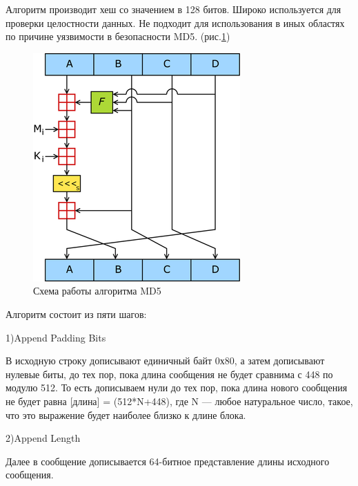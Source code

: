 \documentclass[a4paper, 12pt, oneside]{scrartcl}
\begin{document}
    Алгоритм производит хеш со значением в 128 битов. Широко используется для проверки целостности данных.
    Не подходит для использования в иных областях по причине уязвимости в безопасности MD5. (рис.\ref{fig:key})
    \begin{figure}[h!]
		\centering
		\includegraphics[scale=0.9]{MD5}
		\caption{Схема работы алгоритма MD5}
		\label{fig:key}
	\end{figure}
    \par
    Алгоритм состоит из пяти шагов:\par
    1)Append Padding Bits\par
    В исходную строку дописывают единичный байт 0х80, а затем дописывают нулевые биты, до тех пор, пока длина сообщения не будет сравнима с 448 по модулю 512.
    То есть дописываем нули до тех пор, пока длина нового сообщения не будет равна [длина] = (512*N+448), где N — любое натуральное число, такое, что это выражение будет наиболее близко к длине блока.

    2)Append Length\par
    Далее в сообщение дописывается 64-битное представление длины исходного сообщения.
\end{document}
